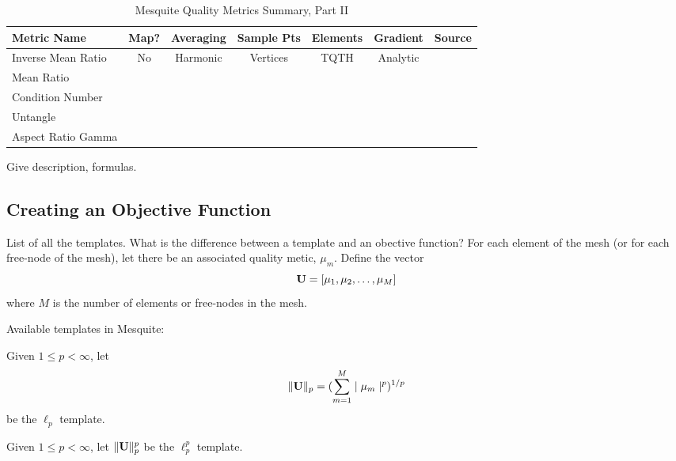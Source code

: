 \begin{table}[h]
\begin{center}
\begin{tabular}{|l|c|c|c|c|c|c|}
\hline
Metric Name & Map? & Averaging & Sample Pts & Elements & Gradient & Source \\ \hline
Inverse Mean Ratio & No & Harmonic & Vertices & TQTH & Analytic & \\ 
Mean Ratio &  &  &  &  &  \\ 
Condition Number &  &  &  &  &  \\ 
Untangle &  &  &  &  &  \\ 
Aspect Ratio Gamma &  &  &  &  &  \\ 
\hline
\end{tabular}
\caption{\label{QualityMetrics2} Mesquite Quality Metrics Summary, Part II}
\end{center}
\end{table}

 \newline
Give description, formulas. 

\subsection{Creating an Objective Function}
List of all the templates. What is the difference between a template and
an obective function? For each element of the mesh (or for each 
free-node of the mesh), let there be an associated quality metic, 
$\mu_m$.  Define the vector 
\begin{equation}
{\bf U} = [ \mu_1, \mu_2, \ldots, \mu_M ]
\end{equation}
where $M$ is the number of elements or free-nodes in the mesh. \newline

\noindent Available templates in Mesquite: \newline

 \newline
Given $1 \leq p < \infty$, let
\begin{equation}
\| {\bf U} \|_p = ( \sum_{m=1}^M \mid \mu_m \mid^p )^{1/p}
\end{equation}
be the $\ell_p$ template. \newline

 \newline
Given $1 \leq p < \infty$, let $\| {\bf U} \|_p^p$ be the 
$\ell_p^p$ template. \newline

